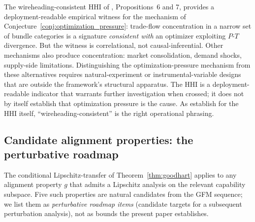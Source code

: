 \begin{remark}
\label{rem:hhi_empirical_witness}
The wireheading-consistent HHI of
\citep[Need~Sufficiency]{lasser2026paper8b}, Propositions~6 and 7,
provides a deployment-readable empirical witness for the
mechanism of Conjecture~\ref{conj:optimization_pressure}: trade-flow
concentration in a narrow set of bundle categories is a signature
\emph{consistent with} an optimizer exploiting $P$-$T$
divergence.  But the witness is correlational, not
causal-inferential.  Other mechanisms also produce concentration:
market consolidation, demand shocks, supply-side limitations.
Distinguishing the optimization-pressure mechanism from these
alternatives requires natural-experiment or instrumental-variable
designs that are outside the framework's structural apparatus.
The HHI is a deployment-readable indicator that warrants further
investigation when crossed; it does not by itself establish that
optimization pressure is the cause.  As
\citep[Propositions~6~and~7]{lasser2026paper8b} establish for the
HHI itself, ``wireheading-consistent'' is the right operational
phrasing.
\end{remark}

\subsection{Candidate alignment properties: the perturbative roadmap}
\label{sec:goodhart_examples}

The conditional Lipschitz-transfer of Theorem~\ref{thm:goodhart}
applies to any alignment property $g$ that admits a Lipschitz
analysis on the relevant capability subspace.  Five such properties
are natural candidates from the GFM sequence; we list them as
\emph{perturbative roadmap items} (candidate targets for a
subsequent perturbation analysis), not as bounds the present
paper establishes.

